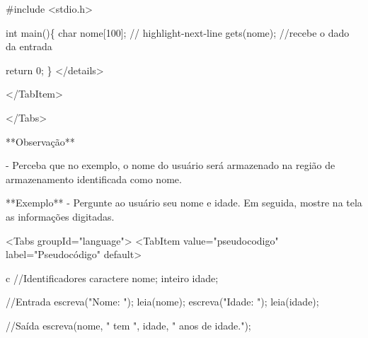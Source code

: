 \documentclass[
  letterpaper,
  DIV=11,
  numbers=noendperiod]{scrreprt}
\newenvironment{Shaded}{\begin{snugshade}}{\end{snugshade}}
\newcommand{\CommentTok}[1]{\textcolor[rgb]{0.37,0.37,0.37}{#1}}
\newcommand{\ControlFlowTok}[1]{\textcolor[rgb]{0.00,0.23,0.31}{#1}}
\newcommand{\DataTypeTok}[1]{\textcolor[rgb]{0.68,0.00,0.00}{#1}}
\newcommand{\DecValTok}[1]{\textcolor[rgb]{0.68,0.00,0.00}{#1}}
\newcommand{\ImportTok}[1]{\textcolor[rgb]{0.00,0.46,0.62}{#1}}
\newcommand{\NormalTok}[1]{\textcolor[rgb]{0.00,0.23,0.31}{#1}}
\newcommand{\OperatorTok}[1]{\textcolor[rgb]{0.37,0.37,0.37}{#1}}
\newcommand{\PreprocessorTok}[1]{\textcolor[rgb]{0.68,0.00,0.00}{#1}}
\newcommand{\StringTok}[1]{\textcolor[rgb]{0.13,0.47,0.30}{#1}}
\begin{document}
\begin{Shaded}
\begin{Highlighting}[]
    \PreprocessorTok{\#include }\ImportTok{\textless{}stdio.h\textgreater{}}

    \DataTypeTok{int}\NormalTok{ main}\OperatorTok{()\{}
      \DataTypeTok{char}\NormalTok{ nome}\OperatorTok{[}\DecValTok{100}\OperatorTok{];}
    \CommentTok{// highlight{-}next{-}line}
\NormalTok{      gets}\OperatorTok{(}\NormalTok{nome}\OperatorTok{);} \CommentTok{//recebe o dado da entrada}

      \ControlFlowTok{return} \DecValTok{0}\OperatorTok{;}
    \OperatorTok{\}}
\NormalTok{    \textasciigrave{}\textasciigrave{}\textasciigrave{}}
  \OperatorTok{\textless{}/}\NormalTok{details}\OperatorTok{\textgreater{}}

  \OperatorTok{\textless{}/}\NormalTok{TabItem}\OperatorTok{\textgreater{}}

\OperatorTok{\textless{}/}\NormalTok{Tabs}\OperatorTok{\textgreater{}}


\OperatorTok{**}\NormalTok{Observação}\OperatorTok{**}  

\OperatorTok{{-}}\NormalTok{ Perceba que no exemplo}\OperatorTok{,}\NormalTok{ o nome }\ControlFlowTok{do}\NormalTok{ usuário será armazenado na região de armazenamento identificada como \textasciigrave{}nome\textasciigrave{}}\OperatorTok{.}

\OperatorTok{**}\NormalTok{Exemplo}\OperatorTok{**}
\OperatorTok{{-}}\NormalTok{ Pergunte ao usuário seu nome e idade}\OperatorTok{.}\NormalTok{ Em seguida}\OperatorTok{,}\NormalTok{ mostre na tela as informações digitadas}\OperatorTok{.}

\OperatorTok{\textless{}}\NormalTok{Tabs groupId}\OperatorTok{=}\StringTok{"language"}\OperatorTok{\textgreater{}}
  \OperatorTok{\textless{}}\NormalTok{TabItem value}\OperatorTok{=}\StringTok{"pseudocodigo"}\NormalTok{ label}\OperatorTok{=}\StringTok{"Pseudocódigo"} \ControlFlowTok{default}\OperatorTok{\textgreater{}}

\NormalTok{  \textasciigrave{}\textasciigrave{}\textasciigrave{}c}
  \CommentTok{//Identificadores}
\NormalTok{  caractere nome}\OperatorTok{;}
\NormalTok{  inteiro idade}\OperatorTok{;}

  \CommentTok{//Entrada}
\NormalTok{  escreva}\OperatorTok{(}\StringTok{"Nome: "}\OperatorTok{);}
\NormalTok{  leia}\OperatorTok{(}\NormalTok{nome}\OperatorTok{);}
\NormalTok{  escreva}\OperatorTok{(}\StringTok{"Idade: "}\OperatorTok{);}
\NormalTok{  leia}\OperatorTok{(}\NormalTok{idade}\OperatorTok{);}

  \CommentTok{//Saída}
\NormalTok{  escreva}\OperatorTok{(}\NormalTok{nome}\OperatorTok{,} \StringTok{" tem "}\OperatorTok{,}\NormalTok{ idade}\OperatorTok{,} \StringTok{" anos de idade."}\OperatorTok{);}
\end{Highlighting}
\end{Shaded}
\end{document}
